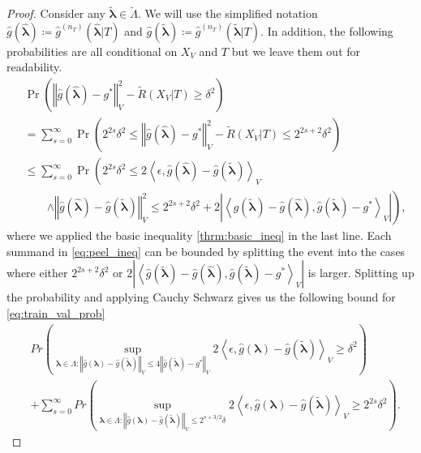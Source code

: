 \documentclass[10pt]{book}
\theoremstyle{definition}
\begin{document}
\begin{proof}
	Consider any $\tilde{\boldsymbol{\lambda}} \in \tilde{\Lambda}$.
	We will use the simplified notation $\hat{g}(\hat{\boldsymbol{\lambda}}) \coloneqq \hat{g}^{(n_T)}(\hat{\boldsymbol{\lambda}} | T)$ and $\hat{g}(\tilde{\boldsymbol{\lambda}}) \coloneqq \hat{g}^{(n_T)}(\tilde{\boldsymbol{\lambda}} | T)$. In addition, the following probabilities are all conditional on $X_V$ and $T$ but we leave them out for readability.
	\begin{align}
	& \Pr\left(
	\left\Vert \hat{g}(\hat{\boldsymbol{\lambda}})-g^{*}\right\Vert _{V}^{2}
	- \tilde{R}(X_V|T)
	\ge \delta^2
	\right) \label{eq:train_val_prob}\\
	& = \sum_{s=0}^{\infty}
	\Pr\left(
	2^{2s}\delta^{2}
	\le \left\Vert \hat{g}(\hat{\boldsymbol{\lambda}})-g^{*}\right\Vert _{V}^{2}
	-\tilde{R}(X_V|T)
	\le 2^{2s+2}\delta^{2}\right) 
	\label{eq:peeled} \\
	&\le \sum_{s=0}^{\infty}
	\Pr\left(
	2^{2s}\delta^{2}
	\le 2\left\langle \epsilon,\hat{g}(\hat{\boldsymbol{\lambda}})-\hat{g}(\tilde{\boldsymbol{\lambda}})\right\rangle _{V}\right. \label{eq:peel_ineq}\\
	& \qquad  \left.\wedge \left\Vert \hat{g}(\hat{\boldsymbol{\lambda}})-\hat{g}(\tilde{\boldsymbol{\lambda}})\right\Vert_{V}^{2}\le2^{2s+2}\delta^{2}+ 2\left|\left\langle \hat{g}(\tilde{\boldsymbol{\lambda}})-\hat{g}(\hat{\boldsymbol{\lambda}}),\hat{g}(\tilde{\boldsymbol{\lambda}})-g^{*}\right\rangle _{V}\right| \right ),
	\end{align}
	where we applied the basic inequality \eqref{thrm:basic_ineq} in the last line.
	Each summand in \eqref{eq:peel_ineq} can be bounded by splitting the event into the cases where either $2^{2s+2} \delta^2$ or $2\left|\left\langle \hat{g}(\tilde{\boldsymbol{\lambda}})-\hat{g}(\hat{\boldsymbol{\lambda}}),\hat{g}(\tilde{\boldsymbol{\lambda}})-g^{*}\right\rangle _{V}\right|$ is larger. Splitting up the probability and applying Cauchy Schwarz gives us the following bound for \eqref{eq:train_val_prob}
	\begin{align}
	& Pr\left(
	\sup_{\boldsymbol{\lambda} \in \Lambda: \left\Vert \hat{g}({\boldsymbol{\lambda}})-\hat{g}(\tilde{\boldsymbol{\lambda}})\right\Vert _{V}
		\le
		4\left\Vert \hat{g}(\tilde{\boldsymbol{\lambda}})-g^{*}\right\Vert _{V}}
	2\left\langle \epsilon,\hat{g}({\boldsymbol{\lambda}})-\hat{g}(\tilde{\boldsymbol{\lambda}})\right\rangle _{V}
	\ge 
	\delta^{2}
	\right)
	\label{eq:train_val_1}
	\\
	& + \sum_{s=0}^{\infty} Pr\left(
	\sup_{\boldsymbol{\lambda} \in \Lambda: \left\Vert \hat{g}({\boldsymbol{\lambda}})-\hat{g}(\tilde{\boldsymbol{\lambda}})\right\Vert _{V}
		\le
		2^{s+3/2}\delta}
	2\left\langle \epsilon,\hat{g}({\boldsymbol{\lambda}})-\hat{g}(\tilde{\boldsymbol{\lambda}})\right\rangle _{V}
	\ge
	2^{2s} \delta^{2}
	\right)
	\label{eq:train_val_2}.
	\end{align}
	

\end{proof}
\end{document}
